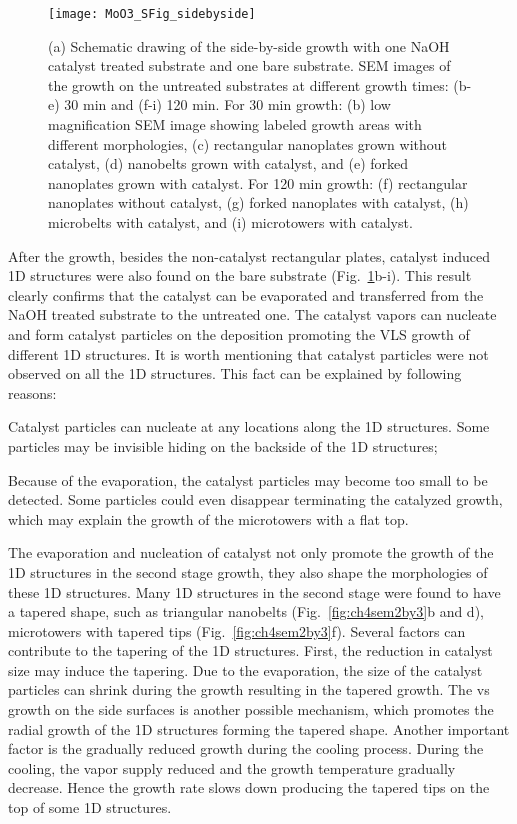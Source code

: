 \begin{figure}[htb]
\centering
\texttt{[image: MoO3\_SFig\_sidebyside]}
\caption[side by side growth of ]{(a) Schematic drawing of the side-by-side growth with one NaOH catalyst treated substrate and one bare substrate. SEM images of the growth on the untreated substrates at different growth times: (b-e) 30 min and (f-i) 120 min. For 30 min growth: (b) low magnification SEM image showing labeled growth areas with different morphologies, (c) rectangular nanoplates grown without catalyst, (d) nanobelts grown with catalyst, and (e) forked nanoplates grown with catalyst. For 120 min growth: (f) rectangular nanoplates without catalyst, (g) forked nanoplates with catalyst, (h) microbelts with catalyst, and (i) microtowers with catalyst.}
\label{fig:ch4sbs}
\end{figure}

After the growth, besides the non-catalyst rectangular plates, catalyst induced 1D structures were also found on the bare substrate (Fig.~\ref{fig:ch4sbs}b-i). This result clearly confirms that the catalyst can be evaporated and transferred from the NaOH treated substrate to the untreated one. The catalyst vapors can nucleate and form catalyst particles on the  deposition promoting the VLS growth of different 1D structures. It is worth mentioning that catalyst particles were not observed on all the 1D structures. This fact can be explained by following reasons:
\begin{enumerate*}[label=\itshape\alph*\upshape)]
\item Catalyst particles can nucleate at any locations along the 1D structures. Some particles may be invisible hiding on the backside of the 1D structures;
\item Because of the evaporation, the catalyst particles may become too small to be detected. Some particles could even disappear terminating the catalyzed growth, which may explain the growth of the microtowers with a flat top.
\end{enumerate*} The evaporation and nucleation of catalyst not only promote the growth of the 1D structures in the second stage growth, they also shape the morphologies of these 1D structures. Many 1D structures in the second stage were found to have a tapered shape, such as triangular nanobelts (Fig.~\ref{fig:ch4sem2by3}b and d), microtowers with tapered tips (Fig.~\ref{fig:ch4sem2by3}f). Several factors can contribute to the tapering of the 1D structures. First, the reduction in catalyst size may induce the tapering. Due to the evaporation, the size of the catalyst particles can shrink during the growth resulting in the tapered growth. The \gls{vs} growth on the side surfaces is another possible mechanism, which promotes the radial growth of the 1D structures forming the tapered shape. Another important factor is the gradually reduced growth during the cooling process. During the cooling, the  vapor supply reduced and the growth temperature gradually decrease. Hence the growth rate slows down producing the tapered tips on the top of some 1D structures.


